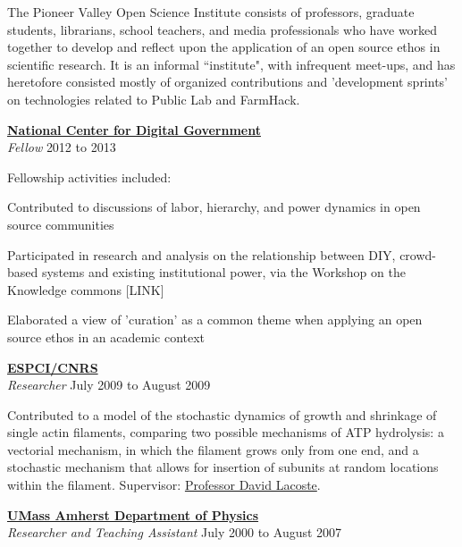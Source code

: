 \documentclass[10pt]{article}
\newcommand{\blankline}{\quad\pagebreak[3]}
\newcommand{\halfblankline}{\quad\vspace{-0.5\baselineskip}\pagebreak[3]}
\begin{document}
\halfblankline

The Pioneer Valley Open Science Institute consists of professors, graduate students, librarians, school teachers, and media professionals who have worked together to develop and reflect upon the application of an open source ethos in scientific research.  It is an informal ``institute", with infrequent meet-ups, and has heretofore consisted mostly of organized contributions and 'development sprints' on technologies related to Public Lab and FarmHack.  

\blankline

\href{http://www.umass.edu/digitalcenter/}{\textbf{National Center for Digital Government}}\\
\emph{Fellow} \hfill {2012 to 2013}

\halfblankline

Fellowship activities included:

\begin{innerlist}
\item Contributed to discussions of labor, hierarchy, and power dynamics in open source communities
\item Participated in research and analysis on the relationship between DIY, crowd-based systems and existing institutional power, via the Workshop on the Knowledge commons [LINK]
\item Elaborated a view of 'curation' as a common theme when applying an open source ethos in an academic context
\end{innerlist}
   
\blankline

\href{http://www.umass.edu/digitalcenter/}{\textbf{ESPCI/CNRS}}\\
\emph{Researcher} \hfill {July 2009 to August 2009}

\halfblankline

Contributed to a model of the stochastic dynamics of growth and shrinkage of single actin filaments,
comparing two possible mechanisms of ATP hydrolysis: a vectorial mechanism, in which the filament
grows only from one end, and a stochastic mechanism that allows for insertion of subunits at random
locations within the filament. Supervisor: \href{}{Professor David Lacoste}.
   
\blankline


\href{http://www.umass.edu/digitalcenter/}{\textbf{UMass Amherst Department of Physics}}\\
\emph{Researcher and Teaching Assistant} \hfill {July 2000 to August 2007}
\end{document}
